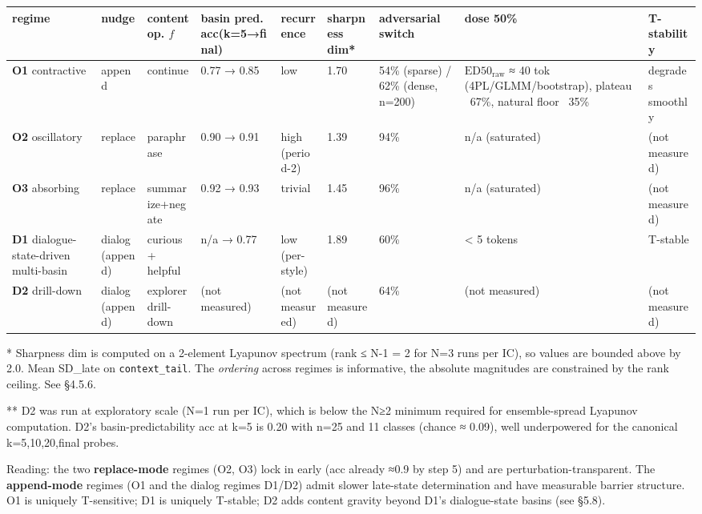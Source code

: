 \documentclass{article}
\theoremstyle{plain}
\theoremstyle{definition}
\begin{document}
\begin{table}[h!]
\centering
\small
\begin{tabularx}{\textwidth}{lYYYYYYYY}
\toprule
regime & nudge & content op. $f$ & basin pred. acc(k=5→final) & recurrence & sharpness dim* & adversarial switch & dose 50\% & T-stability \\
\midrule
\textbf{O1} contractive & append & continue & 0.77 → 0.85 & low & 1.70 & 54\% (sparse) / 62\% (dense, n=200) & $\mathrm{ED50}_{\mathrm{raw}}$ ≈ 40 tok (4PL/GLMM/bootstrap), plateau ~67\%, natural floor ~35\% & degrades smoothly \\
\textbf{O2} oscillatory & replace & paraphrase & 0.90 → 0.91 & high (period-2) & 1.39 & 94\% & n/a (saturated) & (not measured) \\
\textbf{O3} absorbing & replace & summarize+negate & 0.92 → 0.93 & trivial & 1.45 & 96\% & n/a (saturated) & (not measured) \\
\textbf{D1} dialogue-state-driven multi-basin & dialog (append) & curious + helpful & n/a → 0.77 & low (per-style) & 1.89 & 60\% & < 5 tokens & T-stable \\
\textbf{D2} drill-down & dialog (append) & explorer drill-down & (not measured) & (not measured) & (not measured) & 64\% & (not measured) & (not measured) \\
\bottomrule
\end{tabularx}
\end{table}

* Sharpness dim is computed on a 2-element Lyapunov spectrum (rank ≤ N-1 = 2 for N=3 runs per IC), so values are bounded above by 2.0. Mean SD\_late on \texttt{context\_tail}. The \textit{ordering} across regimes is informative, the absolute magnitudes are constrained by the rank ceiling. See §4.5.6.

** D2 was run at exploratory scale (N=1 run per IC), which is below the N≥2 minimum required for ensemble-spread Lyapunov computation. D2's basin-predictability acc at k=5 is 0.20 with n=25 and 11 classes (chance ≈ 0.09), well underpowered for the canonical k=5,10,20,final probes.

Reading: the two \textbf{replace-mode} regimes (O2, O3) lock in early (acc
already ≈0.9 by step 5) and are perturbation-transparent. The
\textbf{append-mode} regimes (O1 and the dialog regimes D1/D2) admit
slower late-state determination and have measurable barrier structure.
O1 is uniquely T-sensitive; D1 is uniquely T-stable; D2 adds content
gravity beyond D1's dialogue-state basins (see §5.8).
\end{document}
